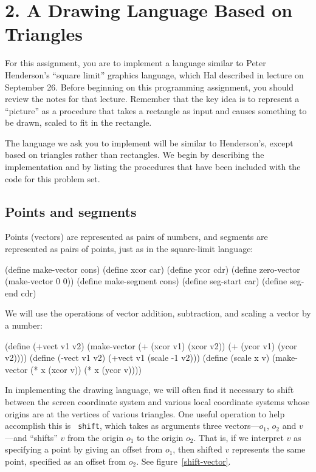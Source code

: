 \section{2. A Drawing Language Based on Triangles}

For this assignment, you are to implement a language similar to Peter
Henderson's ``square limit'' graphics language, which Hal described in
lecture on September 26.  Before beginning on this programming
assignment, you should review the notes for that lecture.  Remember
that the key idea is to represent a ``picture'' as a procedure that
takes a rectangle as input and causes something to be drawn, scaled to
fit in the rectangle.

The language we ask you to implement will be similar to Henderson's,
except based on triangles rather than rectangles.  We begin by
describing the implementation and by listing the procedures that have
been included with the code for this problem set.

\subsection{Points and segments}

Points (vectors) are represented as pairs of numbers, and segments are
represented as pairs of points, just as in the square-limit language:

\beginlisp
(define make-vector cons)
(define xcor car)
(define ycor cdr)
\null
(define zero-vector (make-vector 0 0))
\null
(define make-segment cons)
(define seg-start car)
(define seg-end cdr)
\endlisp

We will use the operations of vector addition, subtraction, and
scaling a vector by a number:

\beginlisp
(define (+vect v1 v2)
  (make-vector (+ (xcor v1) (xcor v2))
               (+ (ycor v1) (ycor v2))))
\null
(define (-vect v1 v2)
  (+vect v1 (scale -1 v2)))
\null
(define (scale x v)
  (make-vector (* x (xcor v))
               (* x (ycor v))))
\endlisp

In implementing the drawing language, we will often find it necessary
to shift between the screen coordinate system and various local
coordinate systems whose origins are at the vertices of various
triangles.  One useful operation to help accomplish this is {\tt
shift}, which takes as arguments three vectors---$o_1$, $o_2$ and
$v$---and ``shifts'' $v$ from the origin $o_1$ to the origin $o_2$.
That is, if we interpret $v$ as specifying a point by giving an offset
from $o_1$, then shifted $v$ represents the same point, specified as
an offset from $o_2$.  See figure~\ref{shift-vector}.


